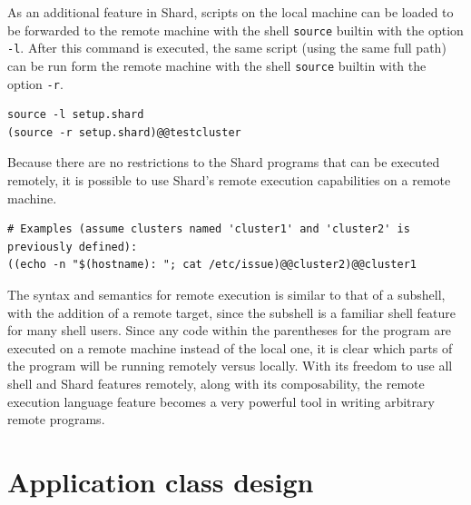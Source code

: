 \documentclass[oneside]{report}
\begin{document}
As an additional feature in Shard, scripts on the local machine can be loaded to be forwarded to the remote machine with the shell \texttt{source} builtin with the option \texttt{-l}.
After this command is executed, the same script (using the same full path) can be run form the remote machine with the shell \texttt{source} builtin with the option \texttt{-r}.

\begin{minipage}[c]{\textwidth-15pt}
  \begin{lstlisting}[language=Shard]
source -l setup.shard
(source -r setup.shard)@@testcluster
\end{lstlisting}
  \smallskip
\end{minipage}

Because there are no restrictions to the Shard programs that can be executed remotely, it is possible to use Shard's remote execution capabilities on a remote machine.

\begin{minipage}[c]{\textwidth-15pt}
  \begin{lstlisting}[language=Shard]
# Examples (assume clusters named 'cluster1' and 'cluster2' is previously defined):
((echo -n "$(hostname): "; cat /etc/issue)@@cluster2)@@cluster1
\end{lstlisting}
  \smallskip
\end{minipage}

The syntax and semantics for remote execution is similar to that of a subshell, with the addition of a remote target, since the subshell is a familiar shell feature for many shell users.
Since any code within the parentheses for the program are executed on a remote machine instead of the local one, it is clear which parts of the program will be running remotely versus locally.
With its freedom to use all shell and Shard features remotely, along with its composability, the remote execution language feature becomes a very powerful tool in writing arbitrary remote programs.


\section{Application class design}

\end{document}
